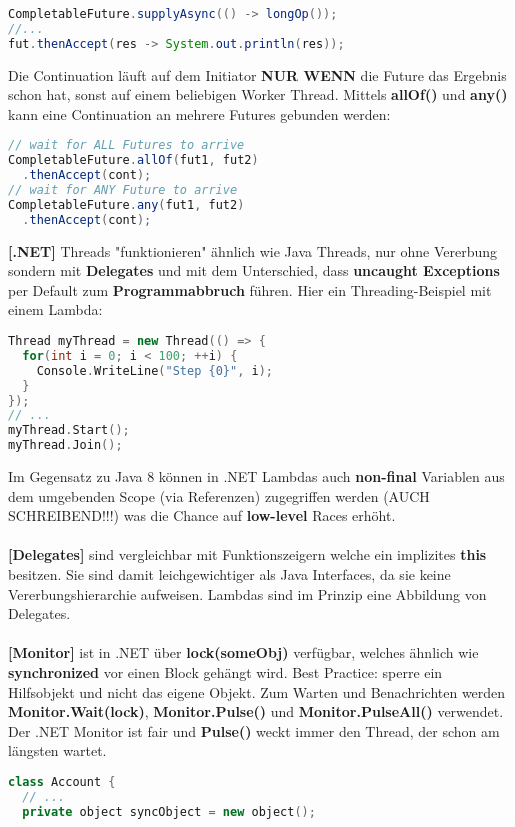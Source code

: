 \documentclass[8pt]{extarticle}
\let\oldtextbf\textbf
\renewcommand{\textbf}{\tiny\oldtextbf}
\begin{document}
\begin{multicols*}{5}
\begin{lstlisting}[language=java]
  CompletableFuture.supplyAsync(() -> longOp());
//...
fut.thenAccept(res -> System.out.println(res));
\end{lstlisting}
Die Continuation läuft auf dem Initiator \textbf{NUR WENN} die Future das Ergebnis schon hat, sonst auf einem beliebigen Worker Thread. Mittels \textbf{allOf()} und \textbf{any()} kann eine Continuation an mehrere Futures gebunden werden:
\begin{lstlisting}[language=java]
// wait for ALL Futures to arrive
CompletableFuture.allOf(fut1, fut2)
  .thenAccept(cont);
// wait for ANY Future to arrive
CompletableFuture.any(fut1, fut2)
  .thenAccept(cont);
\end{lstlisting}
\textbf{[.NET]} Threads "funktionieren" ähnlich wie Java Threads, nur ohne Vererbung sondern mit \textbf{Delegates} und mit dem Unterschied, dass \textbf{uncaught Exceptions} per Default zum \textbf{Programmabbruch} führen. Hier ein Threading-Beispiel mit einem Lambda:
\begin{lstlisting}[language=c++]
Thread myThread = new Thread(() => {
  for(int i = 0; i < 100; ++i) {
    Console.WriteLine("Step {0}", i);
  }
});
// ...
myThread.Start();
myThread.Join();
\end{lstlisting}
Im Gegensatz zu Java 8 können in .NET Lambdas auch \textbf{non-final} Variablen aus dem umgebenden Scope (via Referenzen) zugegriffen werden (AUCH SCHREIBEND!!!) was die Chance auf \textbf{low-level} Races erhöht.\\\\
\textbf{[Delegates]} sind vergleichbar mit Funktionszeigern welche ein implizites \textbf{this} besitzen. Sie sind damit leichgewichtiger als Java Interfaces, da sie keine Vererbungshierarchie aufweisen. Lambdas sind im Prinzip eine Abbildung von Delegates.\\\\
\textbf{[Monitor]} ist in .NET über \textbf{lock(someObj)} verfügbar, welches ähnlich wie \textbf{synchronized} vor einen Block gehängt wird. Best Practice: sperre ein Hilfsobjekt und nicht das eigene Objekt. Zum Warten und Benachrichten werden \textbf{Monitor.Wait(lock)}, \textbf{Monitor.Pulse()} und \textbf{Monitor.PulseAll()} verwendet. Der .NET Monitor ist fair und \textbf{Pulse()} weckt immer den Thread, der schon am längsten wartet.
\begin{lstlisting}[language=c++]
class Account {
  // ...
  private object syncObject = new object();


\end{lstlisting}
\end{multicols*}
\end{document}
